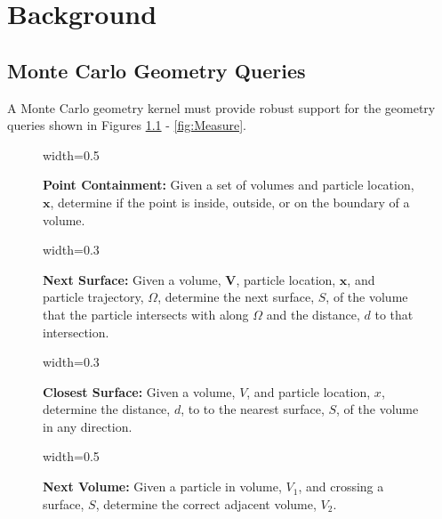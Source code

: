 \newcommand{\geomQuery}[4] {
  \begin{figure}[H]
    \centering
    {width=#3\textwidth}
    \caption[Explanation of the \textit{#1} geometry query]{\textbf{#1:}#4}
    \label{fig:#1}
  \end{figure}
}

\newcommand{\vecdatatype}[2]{
  \null
  \textbf{#1}
  \begin{adjustwidth}{1em}{0pt}
    #2
  \end{adjustwidth}
  \null
}

\newcommand{\codecallout}[2] {
  \null
  \begin{adjustwidth}{1em}{0pt}
    \textbf{#1:}
    #2
  \end{adjustwidth}
  \null
}


\renewcommand{\thefootnote}{\fnsymbol{footnote}}


\chapter{Background}\label{ch:background}

\section{Monte Carlo Geometry Queries}\label{sec:mc-geom-queries}

A Monte Carlo geometry kernel must provide robust support for the geometry
queries shown in Figures \ref{fig:Point Containment} -
\ref{fig:Measure}.

\geomQuery{Point Containment}{plc_query}{0.5}{
Given a set of volumes and particle location, $\mathbf{x}$, determine if the
point is inside, outside, or on the boundary of a volume.
}

\geomQuery{Next Surface}{dtb_query}{0.3}{
Given a volume, $\mathbf{V}$, particle location, $\mathbf{x}$, and particle
trajectory, \boldmath$\Omega$, determine the next surface, \boldmath$S$, of the
volume that the particle intersects with along \boldmath$\Omega$ and the
distance, \boldmath$d$ to that intersection.
}

\geomQuery{Closest Surface}{ctl_query}{0.3}{
Given a volume, \boldmath$V$, and particle location, \boldmath$x$, determine
the distance, \boldmath$d$, to to the nearest surface, \boldmath$S$, of the
volume in any direction.
}

\geomQuery{Next Volume}{next_vol_query}{0.5}{
Given a particle in volume, \boldmath$V_1$, and crossing a surface, \boldmath$S$,
determine the correct adjacent volume, \boldmath$V_2$.
}

